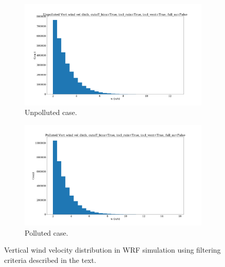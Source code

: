 \documentclass{article}
\begin{document}
\begin{figure}[ht]
	\centering
	\begin{subfigure}{0.7\textwidth}
		\includegraphics[width=\textwidth]{revmywrf/v9_w_hist_Unpolluted_figure.png}
		\caption{Unpolluted case.}
		\label{wrfwhistunpoll}
	\end{subfigure}
	\begin{subfigure}{0.7\textwidth}
		\includegraphics[width=\textwidth]{revmywrf/v9_w_hist_Polluted_figure.png}
		\caption{Polluted case.}
		\label{wrfwhistpoll}
	\end{subfigure}
	\caption{Vertical wind velocity distribution in WRF simulation using filtering criteria described in the text.}
	\label{wrfwhist}
\end{figure}

\clearpage
\newpage
\end{document}
